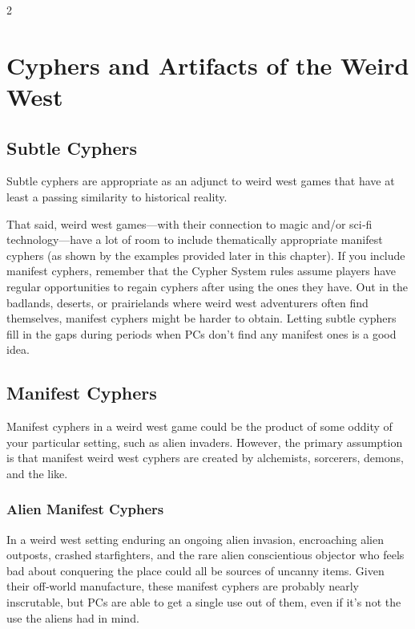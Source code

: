 
\begin{multicols}{2}

\chapter{Cyphers and Artifacts of the Weird West}

\section{Subtle Cyphers}
 
Subtle cyphers are appropriate as an adjunct to weird west games that have at least a passing similarity to historical reality. 

That said, weird west games—with their connection to magic and/or sci‑fi technology—have a lot of room to include thematically appropriate manifest cyphers (as shown by the examples provided later in this chapter). If you include manifest cyphers, remember that the Cypher System rules assume players have regular opportunities to regain cyphers after using the ones they have. Out in the badlands, deserts, or prairielands where weird west adventurers often find themselves, manifest cyphers might be harder to obtain. Letting subtle cyphers fill in the gaps during periods when PCs don’t find any manifest ones is a good idea.

\section{Manifest Cyphers}
 
Manifest cyphers in a weird west game could be the product of some oddity of your particular setting, such as alien invaders. However, the primary assumption is that manifest weird west cyphers are created by alchemists, sorcerers, demons, and the like.

\subsection{Alien Manifest Cyphers}
 
In a weird west setting enduring an ongoing alien invasion, encroaching alien outposts, crashed starfighters, and the rare alien conscientious objector who feels bad about conquering the place could all be sources of uncanny items. Given their off‑world manufacture, these manifest cyphers are probably nearly inscrutable, but PCs are able to get a single use out of them, even if it’s not the use the aliens had in mind.


\end{multicols}
